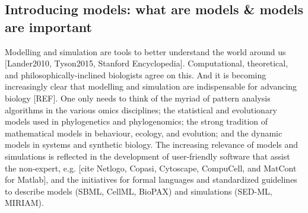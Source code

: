 \subsection{Introducing models: what are models \& models are important}

Modelling and simulation are tools to better understand the world around us [Lander2010, Tyson2015, Stanford Encyclopedia]. Computational, theoretical, and philosophically-inclined biologists agree on this. And it is becoming increasingly clear that modelling and simulation are indispensable for advancing biology [REF]. One only needs to think of the myriad of pattern analysis algorithms in the various omics disciplines; the statistical and evolutionary models used in phylogenetics and phylogenomics; the strong tradition of mathematical models in behaviour, ecology, and evolution; and the dynamic models in systems and synthetic biology. The increasing relevance of models and simulations is reflected in the development of user-friendly software that assist the non-expert, e.g. [cite Netlogo, Copasi, Cytoscape, CompuCell, and MatCont for Matlab], and the initiatives for formal languages and standardized guidelines to describe models (SBML, CellML, BioPAX) and simulations (SED-ML, MIRIAM).
